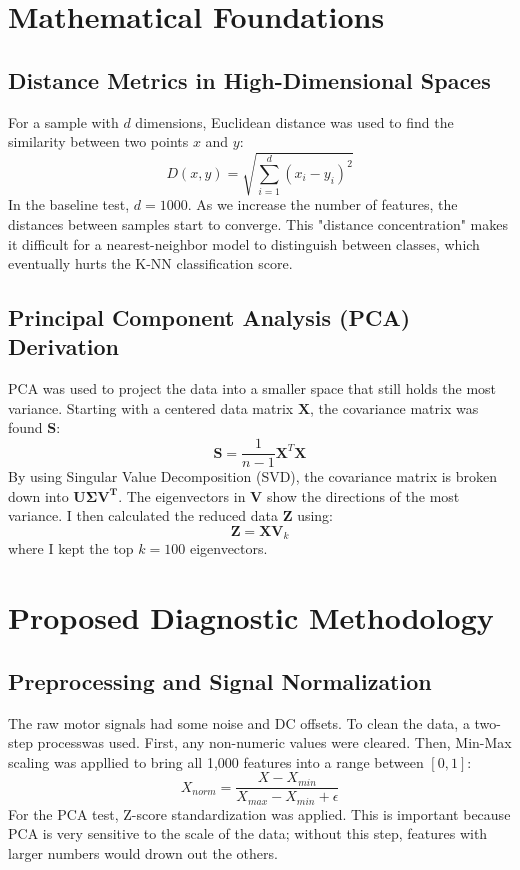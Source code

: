\documentclass[conference]{IEEEtran}
\begin{document}
\section{Mathematical Foundations}

\subsection{Distance Metrics in High-Dimensional Spaces}
For a sample with $d$ dimensions,  Euclidean distance was used to find the similarity between two points $x$ and $y$:
\begin{equation}
D(x, y) = \sqrt{\sum_{i=1}^{d} (x_i - y_i)^2}
\end{equation}
In the baseline test, $d=1000$. As we increase the number of features, the distances between samples start to converge. This "distance concentration" makes it difficult for a nearest-neighbor model to distinguish between classes, which eventually hurts the K-NN classification score.

\subsection{Principal Component Analysis (PCA) Derivation}
 PCA was used to project the data into a smaller space that still holds the most variance. Starting with a centered data matrix $\mathbf{X}$, the covariance matrix was found $\mathbf{S}$:
\begin{equation}
\mathbf{S} = \frac{1}{n-1} \mathbf{X}^T \mathbf{X}
\end{equation}
By using Singular Value Decomposition (SVD), the covariance matrix is broken down into $\mathbf{U \Sigma V^T}$. The eigenvectors in $\mathbf{V}$ show the directions of the most variance. I then calculated the reduced data $\mathbf{Z}$ using:
\begin{equation}
\mathbf{Z} = \mathbf{X} \mathbf{V}_k
\end{equation}
where I kept the top $k=100$ eigenvectors.

\section{Proposed Diagnostic Methodology}

\subsection{Preprocessing and Signal Normalization}
The raw motor signals had some noise and DC offsets. To clean the data, a two-step processwas used. First, any non-numeric values were cleared. Then, Min-Max scaling was appllied to bring all 1,000 features into a range between $[0, 1]$:
\begin{equation}
X_{norm} = \frac{X - X_{min}}{X_{max} - X_{min} + \epsilon}
\end{equation}
For the PCA test, Z-score standardization was applied. This is important because PCA is very sensitive to the scale of the data; without this step, features with larger numbers would drown out the others.
\end{document}
